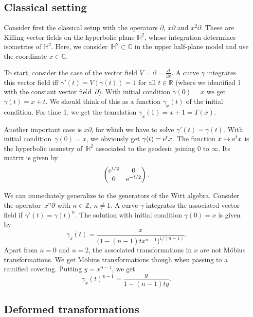 \documentclass[pdftex]{sigma}
\numberwithin{equation}{section}
\newcommand*{\R}{\mathbb{R}}
\newcommand*{\C}{\mathbb{C}}
\renewcommand*{\H}{\mathbb{H}}
\begin{document}
\subsection{Classical setting}
Consider first the classical setup with the operators $\partial$, $x\partial$ and $x^2\partial$. These are Killing vector fields on the hyperbolic plane $\H^2$, whose integration determines isometries of $\H^2$. Here, we consider~${\H^2\subset \C}$ in the upper half-plane model and use the coordinate $x\in\C$.

To start, consider the case of the vector field $V=\partial=\tfrac{\partial}{\partial x}$. A curve $\gamma$ integrates this vector field iff $\gamma'(t)=V(\gamma(t))=1$ for all $t\in \R$ (where we identified 1 with the constant vector field~$\partial$). With initial condition $\gamma(0)=x$ we get $\gamma(t)=x+t$. We should think of this as a function $\gamma_x(t)$ of the initial condition. For time 1, we get the translation $\gamma_x(1)=x+1=T(x)$.

Another important case is $x\partial$, for which we have to solve $\gamma'(t)=\gamma(t)$. With initial condition~${\gamma(0)=x}$, we obviously get $\gamma(t)={\rm e}^t x$. The function $x\mapsto {\rm e}^t x$ is the hyperbolic isometry of~$\H^2$ associated to the geodesic joining 0 to $\infty$. Its matrix is given by
\begin{equation}\label{Eq:dilatation}
\begin{pmatrix} {\rm e}^{t/2} & 0 \\ 0 & {\rm e}^{-t/2} \end{pmatrix}.
\end{equation}

We can immediately generalize to the generators of the Witt algebra. Consider the operator~$x^n \partial$ with $n\in \mathbb{Z}$, $n\neq 1$. A curve $\gamma$ integrates the associated vector field if
$\gamma'(t)=\gamma(t)^{n}$. The solution with initial condition $\gamma(0)=x$ is given by
\[
\gamma_x(t)=\frac{x}{\big(1-(n-1)tx^{n-1}\big)^{1/(n-1)}}.
\]
Apart from $n=0$ and $n=2$, the associated transformations in $x$ are not M\"obius transformations. We get M\"obius transformations though when passing to a ramified covering. Putting $y=x^{n-1}$, we get
\[
\gamma_x(t)^{n-1}=\frac{y}{1-(n-1)ty}.
\]


\subsection{Deformed transformations}
\end{document}
